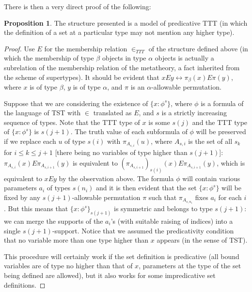 \documentclass{article}
\theoremstyle{definition}
\newtheorem{proposition}[theorem]{Proposition}
\theoremstyle{remark}
\begin{document}
{There is then a very direct proof of the following:}
\begin{proposition}\label{prop:predicative_ttt}
  The structure presented is a model of predicative TTT (in which the definition of a set at a particular type may not mention any higher type).
\end{proposition}
\begin{proof}

Use $E$ for the membership relation $\in_{TTT}$ of the structure defined above (in which the membership of type $\beta$ objects in type $\alpha$ objects is actually a subrelation of the membership relation of the metatheory, a fact inherited from the scheme of supertypes).  It should be evident that $x E y \leftrightarrow \pi_\beta(x) E \pi(y)$,
where $x$ is of type $\beta$, $y$ is of type $\alpha$, and $\pi$ is an $\alpha$-allowable permutation.

Suppose that we are considering the existence of $\{x : \phi^s\}$, where $\phi$ is a formula of the language of TST with $\in$ translated as $E$, and $s$ is a strictly increasing sequence of types.  Note that the TTT type of $x$ is some $s(j)$ and the TTT type of $\{x : \phi^s\}$ is $s(j+1)$.  The truth value of each subformula of $\phi$ will be preserved if we replace each $u$ of type $s(i)$ with $\pi_{A_{s,i}}(u)$, where  $A_{s,i}$ is the set of all $s_k$ for $i \leq k \leq j+1$ [there being no variables of type higher than $s(j+1)$]:  $\pi_{A_{s,i}}(x) E  \pi_{A_{s,i+1}}(y)$ is equivalent to $(\pi_{A_{s,i+1}})_{s(i)}(x) E \pi_{A_{s,i+1}}(y)$, which is equivalent to $xEy$ by the observation above. The formula $\phi$ will contain various parameters $a_i$ of types $s(n_i)$ and it is then evident that the set $\{x : \phi^s\}$ will be fixed by any $s(j+1)$-allowable permutation $\pi$ such that $\pi_{A_{s,n_i}}$ fixes $a_i$ for each $i$.  But this means that
 $\{x : \phi^s\}_{s(j+1)}$ is symmetric and belongs to type $s(j+1)$:
 we can merge the supports of the $a_i$'s (with suitable raising of indices) into a single $s(j+1)$-support.  Notice that we assumed the predicativity condition that no variable more than one type higher than $x$ appears (in the sense of TST).

This procedure will certainly work if the set definition is predicative (all bound variables are of type no higher than that of $x$, parameters at the type
of the set being defined are allowed), but it also works for some impredicative set definitions.
\end{proof}
\end{document}
